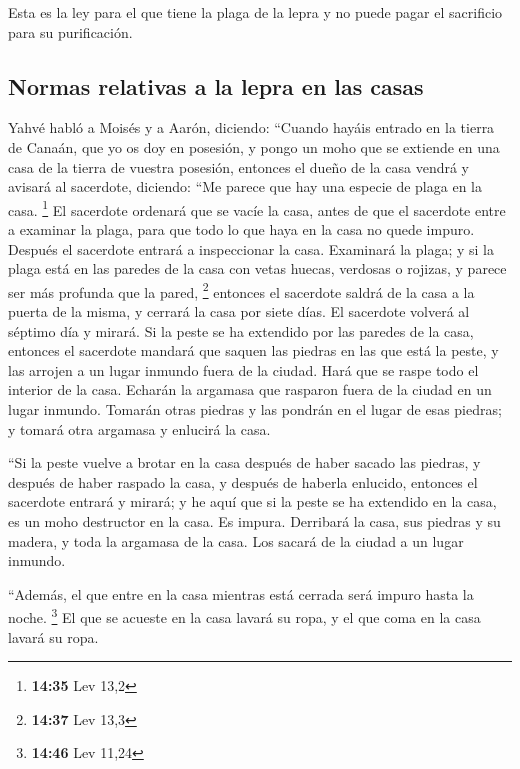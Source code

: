  Esta es la ley para el que tiene la plaga de la lepra y
no puede pagar el sacrificio para su purificación.

\hypertarget{normas-relativas-a-la-lepra-en-las-casas}{%
\subsection{Normas relativas a la lepra en las
casas}\label{normas-relativas-a-la-lepra-en-las-casas}}

 Yahvé habló a Moisés y a Aarón, diciendo:
 ``Cuando hayáis entrado en la tierra de Canaán, que yo
os doy en posesión, y pongo un moho que se extiende en una casa de la
tierra de vuestra posesión,  entonces el dueño de la casa
vendrá y avisará al sacerdote, diciendo: ``Me parece que hay una especie
de plaga en la casa. \footnote{\textbf{14:35} Lev 13,2} 
El sacerdote ordenará que se vacíe la casa, antes de que el sacerdote
entre a examinar la plaga, para que todo lo que haya en la casa no quede
impuro. Después el sacerdote entrará a inspeccionar la casa.
 Examinará la plaga; y si la plaga está en las paredes de
la casa con vetas huecas, verdosas o rojizas, y parece ser más profunda
que la pared, \footnote{\textbf{14:37} Lev 13,3} 
entonces el sacerdote saldrá de la casa a la puerta de la misma, y
cerrará la casa por siete días.  El sacerdote volverá al
séptimo día y mirará. Si la peste se ha extendido por las paredes de la
casa,  entonces el sacerdote mandará que saquen las
piedras en las que está la peste, y las arrojen a un lugar inmundo fuera
de la ciudad.  Hará que se raspe todo el interior de la
casa. Echarán la argamasa que rasparon fuera de la ciudad en un lugar
inmundo.  Tomarán otras piedras y las pondrán en el lugar
de esas piedras; y tomará otra argamasa y enlucirá la casa.

 ``Si la peste vuelve a brotar en la casa después de
haber sacado las piedras, y después de haber raspado la casa, y después
de haberla enlucido,  entonces el sacerdote entrará y
mirará; y he aquí que si la peste se ha extendido en la casa, es un moho
destructor en la casa. Es impura.  Derribará la casa, sus
piedras y su madera, y toda la argamasa de la casa. Los sacará de la
ciudad a un lugar inmundo.

 ``Además, el que entre en la casa mientras está cerrada
será impuro hasta la noche. \footnote{\textbf{14:46} Lev 11,24}
 El que se acueste en la casa lavará su ropa, y el que
coma en la casa lavará su ropa.

